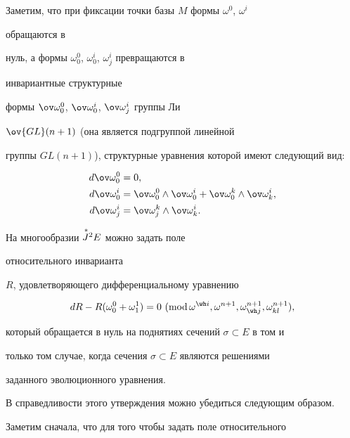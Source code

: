  


Заметим, что при фиксации точки базы $M$ формы $\omega^0$, $\omega^i$ 


обращаются в 


нуль, а формы $\omega^0_0$, $\omega^i_0$, $\omega^i_j$ превращаются в 


инвариантные структурные 


формы $\ov\omega^0_0$, $\ov\omega^i_0$, $\ov\omega^i_j$ группы Ли 


$\ov{GL}(n+1)$ (она является подгруппой линейной 


группы $GL(n+1)$), структурные уравнения которой имеют следующий вид: 


\begin{align*} 


d\ov\omega^0_0&=0,\\ 


d\ov\omega^i_0&=\ov\omega^0_0\wedge\ov\omega^i_0+ 


\ov\omega^k_0\wedge\ov\omega^i_k,\\ 


d\ov\omega^i_j&=\ov\omega^k_j\wedge\ov\omega^i_k. 


\end{align*} 


 


\begin{note} На многообразии $\overset{\,*}{J}{}^2E$ можно задать поле 


относительного инварианта 


$R$, удовлетворяющего дифференциальному уравнению 


$$ 


dR-R(\omega^0_0+\omega^1_1)=0\ (\Mod\omega^{\wh i}, 


\omega^{n+1},\omega^{n+1}_{\wh j},\omega^{n+1}_{kl}), 


$$ 


который обращается в нуль на поднятиях сечений $\sigma\subset E$ в том и 


только том случае, когда сечения $\sigma\subset E$ являются решениями


заданного эволюционного уравнения. 


\end{note} 


 


В справедливости этого утверждения можно убедиться следующим образом. 


Заметим сначала, что для того чтобы задать поле относительного 



